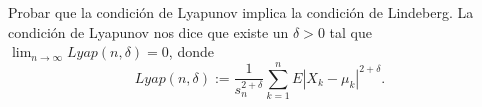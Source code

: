 
\begin{problem}[12] Probar que la condici\'on de Lyapunov implica la condici\'on de Lindeberg. 
La condici\'on de Lyapunov nos dice que existe un $\delta > 0$ tal que
$\lim_{n\to \infty} Lyap(n, \delta) = 0$, donde 
$$
Lyap(n, \delta) := \frac{1}{s_n^{2 + \delta}} \sum_{k=1}^n  E|X_k - \mu_k|^{2 + \delta} .
$$
\solution

\begin{expla}

\end{expla}

\end{problem}








